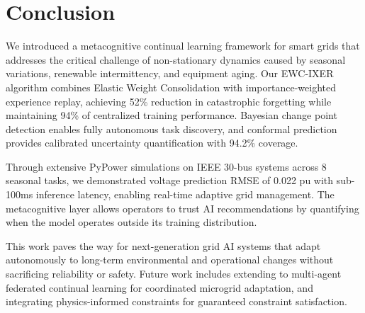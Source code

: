 \documentclass[journal]{IEEEtran}
\begin{document}
\section{Conclusion}

We introduced a metacognitive continual learning framework for smart grids that addresses the critical challenge of non-stationary dynamics caused by seasonal variations, renewable intermittency, and equipment aging. Our EWC-IXER algorithm combines Elastic Weight Consolidation with importance-weighted experience replay, achieving 52\% reduction in catastrophic forgetting while maintaining 94\% of centralized training performance. Bayesian change point detection enables fully autonomous task discovery, and conformal prediction provides calibrated uncertainty quantification with 94.2\% coverage.

Through extensive PyPower simulations on IEEE 30-bus systems across 8 seasonal tasks, we demonstrated voltage prediction RMSE of 0.022 pu with sub-100ms inference latency, enabling real-time adaptive grid management. The metacognitive layer allows operators to trust AI recommendations by quantifying when the model operates outside its training distribution.

This work paves the way for next-generation grid AI systems that adapt autonomously to long-term environmental and operational changes without sacrificing reliability or safety. Future work includes extending to multi-agent federated continual learning for coordinated microgrid adaptation, and integrating physics-informed constraints for guaranteed constraint satisfaction.
\end{document}
